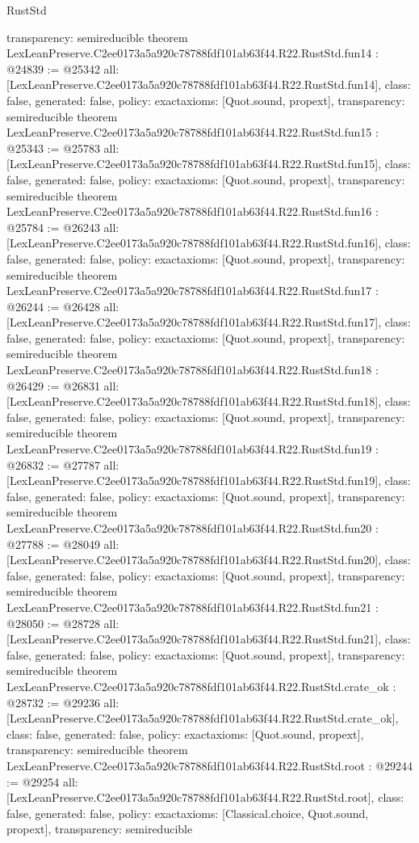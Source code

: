\begin{lexlean}{RustStd}
\begin{coremodule}
{  transparency: semireducible
}
theorem LexLeanPreserve.C2ee0173a5a920c78788fdf101ab63f44.R22.RustStd.fun14 : @24839 := @25342 {
  all: [LexLeanPreserve.C2ee0173a5a920c78788fdf101ab63f44.R22.RustStd.fun14],
  class: false,
  generated: false,
  policy: exact{axioms: [Quot.sound, propext]},
  transparency: semireducible
}
theorem LexLeanPreserve.C2ee0173a5a920c78788fdf101ab63f44.R22.RustStd.fun15 : @25343 := @25783 {
  all: [LexLeanPreserve.C2ee0173a5a920c78788fdf101ab63f44.R22.RustStd.fun15],
  class: false,
  generated: false,
  policy: exact{axioms: [Quot.sound, propext]},
  transparency: semireducible
}
theorem LexLeanPreserve.C2ee0173a5a920c78788fdf101ab63f44.R22.RustStd.fun16 : @25784 := @26243 {
  all: [LexLeanPreserve.C2ee0173a5a920c78788fdf101ab63f44.R22.RustStd.fun16],
  class: false,
  generated: false,
  policy: exact{axioms: [Quot.sound, propext]},
  transparency: semireducible
}
theorem LexLeanPreserve.C2ee0173a5a920c78788fdf101ab63f44.R22.RustStd.fun17 : @26244 := @26428 {
  all: [LexLeanPreserve.C2ee0173a5a920c78788fdf101ab63f44.R22.RustStd.fun17],
  class: false,
  generated: false,
  policy: exact{axioms: [Quot.sound, propext]},
  transparency: semireducible
}
theorem LexLeanPreserve.C2ee0173a5a920c78788fdf101ab63f44.R22.RustStd.fun18 : @26429 := @26831 {
  all: [LexLeanPreserve.C2ee0173a5a920c78788fdf101ab63f44.R22.RustStd.fun18],
  class: false,
  generated: false,
  policy: exact{axioms: [Quot.sound, propext]},
  transparency: semireducible
}
theorem LexLeanPreserve.C2ee0173a5a920c78788fdf101ab63f44.R22.RustStd.fun19 : @26832 := @27787 {
  all: [LexLeanPreserve.C2ee0173a5a920c78788fdf101ab63f44.R22.RustStd.fun19],
  class: false,
  generated: false,
  policy: exact{axioms: [Quot.sound, propext]},
  transparency: semireducible
}
theorem LexLeanPreserve.C2ee0173a5a920c78788fdf101ab63f44.R22.RustStd.fun20 : @27788 := @28049 {
  all: [LexLeanPreserve.C2ee0173a5a920c78788fdf101ab63f44.R22.RustStd.fun20],
  class: false,
  generated: false,
  policy: exact{axioms: [Quot.sound, propext]},
  transparency: semireducible
}
theorem LexLeanPreserve.C2ee0173a5a920c78788fdf101ab63f44.R22.RustStd.fun21 : @28050 := @28728 {
  all: [LexLeanPreserve.C2ee0173a5a920c78788fdf101ab63f44.R22.RustStd.fun21],
  class: false,
  generated: false,
  policy: exact{axioms: [Quot.sound, propext]},
  transparency: semireducible
}
theorem LexLeanPreserve.C2ee0173a5a920c78788fdf101ab63f44.R22.RustStd.crate_ok : @28732 := @29236 {
  all: [LexLeanPreserve.C2ee0173a5a920c78788fdf101ab63f44.R22.RustStd.crate_ok],
  class: false,
  generated: false,
  policy: exact{axioms: [Quot.sound, propext]},
  transparency: semireducible
}
theorem LexLeanPreserve.C2ee0173a5a920c78788fdf101ab63f44.R22.RustStd.root : @29244 := @29254 {
  all: [LexLeanPreserve.C2ee0173a5a920c78788fdf101ab63f44.R22.RustStd.root],
  class: false,
  generated: false,
  policy: exact{axioms: [Classical.choice, Quot.sound, propext]},
  transparency: semireducible
}


\end{coremodule}
\end{lexlean}
